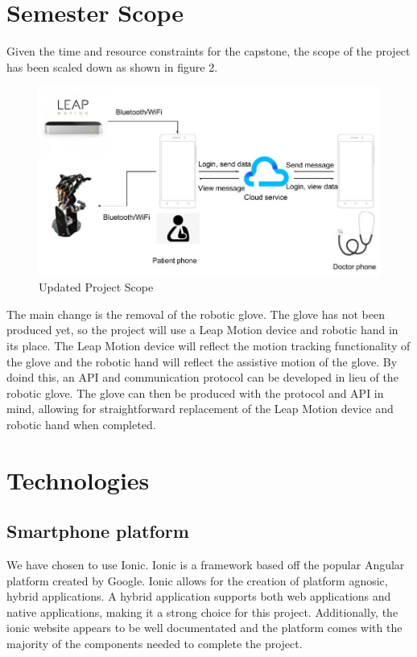 \documentclass[a4paper,10pt]{article}
\begin{document}
\section{Semester Scope}
Given the time and resource constraints for the capstone, the scope of the project has been scaled down as shown in figure 2.
	\begin{figure}[h]
		\centering
		\includegraphics[width=1\textwidth]{semesterScope}
		\caption{Updated Project Scope}
	\end{figure}
The main change is the removal of the robotic glove. The glove has not been produced yet, so the project will use a Leap Motion device and robotic hand in its place. The Leap Motion device will reflect the motion tracking functionality of the glove and the robotic hand will reflect the assistive motion of the glove. By doind this, an API and communication protocol can be developed in lieu of the robotic glove. The glove can then be produced with the protocol and API in mind, allowing for straightforward replacement of the Leap Motion device and robotic hand when completed.

\section{Technologies}

    \subsection{Smartphone platform}
        We have chosen to use Ionic. Ionic is a framework based off the popular Angular platform created by Google. Ionic allows for the creation of platform agnosic, hybrid applications. A hybrid application supports both web applications and native applications, making it a strong choice for this project. Additionally, the ionic website appears to be well documentated and the platform comes with the majority of the components needed to complete the project.
        
\end{document}
